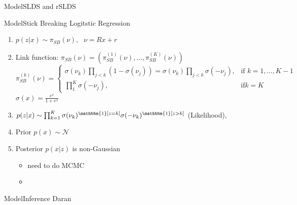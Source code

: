 \documentclass{beamer}
\begin{document}
\begin{frame}{Model}{SLDS and rSLDS}

    \end{frame}

\begin{frame}{Model}{Stick Breaking Logitstic Regression}
       \begin{tcolorbox}[colback=blue!10!white,colframe=blue!50!black,title=??????? ,boxrule=2pt, boxsep=0.1em, left=0.1em, right=0.1em,
fontupper=\fontsize{8}{10}\selectfont] %
\begin{enumerate}[\textbullet]

\item $p(z|x) \sim \pi_{SB}(\nu),\text{ } \nu=Rx+r$
\item Link function: $\pi_{SB}(\nu)=\left( \pi_{SB}^{(1)}(\nu),\dots,\pi_{SB}^{(K)}(\nu) \right)$ \\
$\pi_{SB}^{(k)}(\nu)=\begin{cases}
    \sigma(\nu_k) \prod_{j<k}\left(1- \sigma(\nu_j)\right)=\sigma(\nu_k) \prod_{j<k}\sigma(-\nu_j),& \text{if } k=1,\dots,K-1\\
    \prod_{1}^K \sigma(-\nu_j),              & \text{if} k=K
\end{cases}$\\
$\sigma(x)=\frac{e^x}{1+e^x}$
\item 
$p(z|x) \sim \prod _{k=1}^K \sigma(\nu_k)^{\mathbbm{1} [z=k]} \sigma(-\nu_k)^{\mathbbm{1} [z>k]}$ (Likelihood),
\item Prior $p(x) \sim \mathcal{N} $
\item Posterior $p(x|z)$ is non-Gaussian
\begin{itemize}
            \item need to do MCMC
            \item 
        \end{itemize}
\end{enumerate}
\end{tcolorbox}

    \end{frame}

\begin{frame}{Model}{Inference}
        Daran

    \end{frame}
\end{document}
